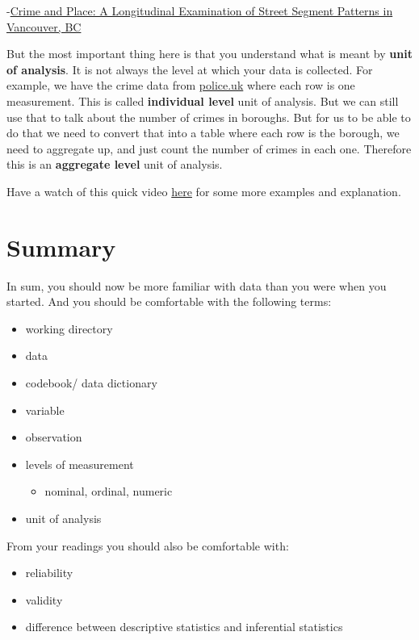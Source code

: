 \documentclass[
]{book}
\providecommand{\tightlist}{%
  \setlength{\itemsep}{0pt}\setlength{\parskip}{0pt}}
\begin{document}
-\href{https://link.springer.com/article/10.1007/s10940-014-9228-3}{Crime and Place: A Longitudinal Examination of Street Segment Patterns in Vancouver, BC}

But the most important thing here is that you understand what is meant by \textbf{unit of analysis}. It is not always the level at which your data is collected. For example, we have the crime data from \url{police.uk} where each row is one measurement. This is called \textbf{individual level} unit of analysis. But we can still use that to talk about the number of crimes in boroughs. But for us to be able to do that we need to convert that into a table where each row is the borough, we need to aggregate up, and just count the number of crimes in each one. Therefore this is an \textbf{aggregate level} unit of analysis.

Have a watch of this quick video \href{https://www.youtube.com/watch?v=XHXTR8jeEUg}{here} for some more examples and explanation.

\hypertarget{summary}{%
\section{Summary}\label{summary}}

In sum, you should now be more familiar with data than you were when you started. And you should be comfortable with the following terms:

\begin{itemize}
\tightlist
\item
  working directory
\item
  data
\item
  codebook/ data dictionary
\item
  variable
\item
  observation
\item
  levels of measurement

  \begin{itemize}
  \tightlist
  \item
    nominal, ordinal, numeric
  \end{itemize}
\item
  unit of analysis
\end{itemize}

From your readings you should also be comfortable with:

\begin{itemize}
\tightlist
\item
  reliability
\item
  validity
\item
  difference between descriptive statistics and inferential statistics
\end{itemize}
\end{document}
